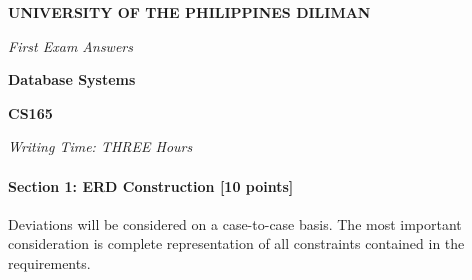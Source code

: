 \documentclass[a4paper,12pt,leqno]{article}
\newcommand{\institution}{UNIVERSITY OF THE PHILIPPINES DILIMAN}
\newcommand{\titlehd}{Database Systems}
\newcommand{\examtype}{First Exam Answers}
\newcommand{\examcode}{CS165}
\newcommand{\writetime}{THREE Hours}
\begin{document}

\begin{center}
\large\textbf{\institution}
\end{center}
\vspace{1cm}

\begin{center}
\textit{ \examtype}
\end{center}
\vspace{1cm}

\begin{center}
\large\textbf{\titlehd}
\end{center}

\begin{center}
\large\textbf{\examcode}
\end{center}
\vspace{4cm}

\begin{center}
\textit{Writing Time:  \writetime}
\end{center}


\newpage
\paragraph{\textbf{Section 1: ERD Construction [10 points]}\\}
Deviations will be considered on a case-to-case basis. The most important consideration is complete representation of all constraints contained in the requirements.
\end{document}
